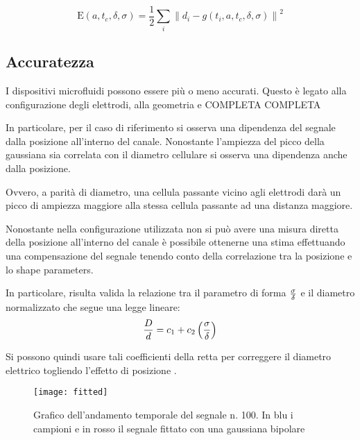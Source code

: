 \begin{equation}
	\mathrm{E}(a,t_c,\delta,\sigma) = \frac{1}{2} \sum_{i}\left\|d_{i}-g\left(t_{i},a,t_c,\delta,\sigma\right)\right\|^{2}
\end{equation}


\subsection{Accuratezza}


I dispositivi microfluidi possono essere più o meno accurati. Questo è legato alla configurazione degli elettrodi, alla geometria e COMPLETA COMPLETA

In particolare, per il caso di riferimento si osserva una dipendenza del segnale dalla posizione all'interno del canale. Nonostante l'ampiezza del picco della gaussiana sia correlata con il diametro cellulare si osserva una dipendenza anche dalla posizione.

Ovvero, a parità di diametro, una cellula passante vicino agli elettrodi darà un picco di ampiezza maggiore alla stessa cellula passante ad una distanza maggiore.

Nonostante nella configurazione utilizzata non si può avere una misura diretta della posizione all'interno del canale è possibile ottenerne una stima effettuando una compensazione del segnale tenendo conto della correlazione tra la posizione e lo shape parameters.

In particolare, risulta valida la relazione tra il parametro di forma $\sigma \over \delta$ e il diametro normalizzato che segue una legge lineare:
\begin{equation}
	{D\over d}={c_1+c_2\left(\sigma \over \delta \right)}
	\label{eq:compensazione}
\end{equation}

Si possono quindi usare tali coefficienti della retta per correggere il diametro elettrico togliendo l'effetto di posizione \cite{errico_mitigating_2017}.



\begin{figure}[t!]
	\centering
	\texttt{[image: fitted]}
	\caption{Grafico dell'andamento temporale del segnale n. 100. In blu i campioni e in rosso il segnale fittato con una gaussiana bipolare}
	\label{fig:fitted}
\end{figure}


